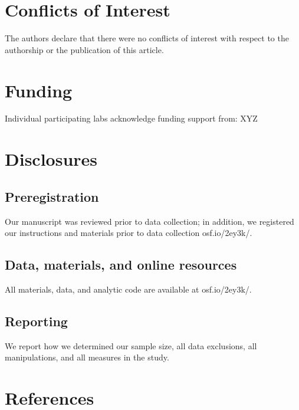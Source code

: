 \documentclass[,man,floatsintext]{apa6}
\begin{document}
\hypertarget{conflicts-of-interest}{%
\section{Conflicts of Interest}\label{conflicts-of-interest}}

The authors declare that there were no conflicts of interest with respect to the authorship or the publication of this article.

\hypertarget{funding}{%
\section{Funding}\label{funding}}

Individual participating labs acknowledge funding support from: XYZ

\hypertarget{disclosures}{%
\section{Disclosures}\label{disclosures}}

\hypertarget{preregistration}{%
\subsection{Preregistration}\label{preregistration}}

Our manuscript was reviewed prior to data collection; in addition, we registered our instructions and materials prior to data collection osf.io/2ey3k/.

\hypertarget{data-materials-and-online-resources}{%
\subsection{Data, materials, and online resources}\label{data-materials-and-online-resources}}

All materials, data, and analytic code are available at osf.io/2ey3k/.

\hypertarget{reporting}{%
\subsection{Reporting}\label{reporting}}

We report how we determined our sample size, all data exclusions, all manipulations, and all measures in the study.

\newpage

\hypertarget{references}{%
\section{References}\label{references}}
\end{document}
